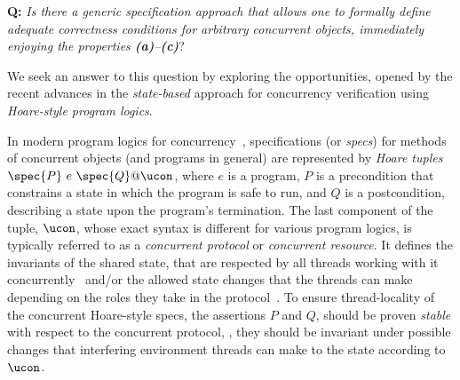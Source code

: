 \vspace{4pt}
\noindent
\textbf{Q:} \emph{Is there a generic specification approach that
  allows one to formally define adequate correctness conditions for
  arbitrary concurrent objects, immediately enjoying the properties
  \emph{\textbf{(a)}--\textbf{(c)}}}?
%
\vspace{4pt}

\noindent
We seek an answer to this question by exploring the opportunities,
opened by the recent advances in the \emph{state-based} approach for
concurrency verification using \emph{Hoare-style program logics}.

In modern program logics for
concurrency~\cite{Feng-al:ESOP07,Vafeiadis-Parkinson:CONCUR07,Feng:POPL09,DinsdaleYoung-al:ECOOP10,Nanevski-al:ESOP14,Svendsen-Birkedal:ESOP14,ArrozPincho-al:ECOOP14,Jung-al:POPL15,Raad-al:ESOP15,Fu-al:CONCUR10},
specifications (or \emph{specs}) for methods of concurrent objects
(and programs in general) are represented by \emph{Hoare tuples}
$\spec{P}~e~\spec{Q}@\ucon$, where $e$ is a program, $P$ is a
precondition that constrains a state in which the program is safe to
run, and $Q$ is a postcondition, describing a state upon the program's
termination. The last component of the tuple, $\ucon$, whose exact
syntax is different for various program logics, is typically referred
to as a \emph{concurrent protocol} or \emph{concurrent resource}.
%
% 
%
It defines the invariants of the shared state, that are respected by
all threads working with it
concurrently~\cite{Nanevski-al:ESOP14,OHearn:TCS07} and/or the allowed
state changes that the threads can make depending on the roles they
take in the protocol~\cite{Jones:TOPLAS83}.
%
To ensure thread-locality of the concurrent Hoare-style specs, the
assertions $P$ and $Q$, should be proven \emph{stable} with respect to
the concurrent protocol, \ie, they should be invariant under possible
changes that interfering environment threads can make to the state
according to $\ucon$.


